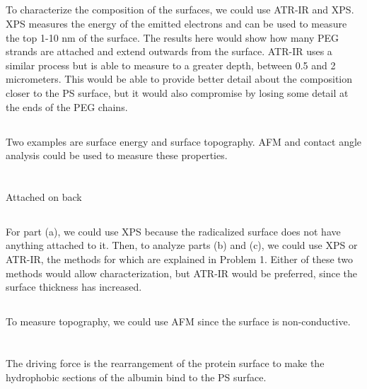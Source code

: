 \documentclass{article}
\begin{document}
\subsection{}
To characterize the composition of the surfaces, we could use ATR-IR and XPS. XPS measures the energy of the emitted electrons and can be used to measure the top 1-10 nm of the surface. The results here would show how many PEG strands are attached and extend outwards from the surface. ATR-IR uses a similar process but is able to measure to a greater depth, between 0.5 and 2 micrometers. This would be able to provide better detail about the composition closer to the PS surface, but it would also compromise by losing some detail at the ends of the PEG chains.

\subsection{}
Two examples are surface energy and surface topography. AFM and contact angle analysis could be used to measure these properties.

\section{}
\subsection{}
Attached on back

\subsection{}
For part (a), we could use XPS because the radicalized surface does not have anything attached to it. Then, to analyze parts (b) and (c), we could use XPS or ATR-IR, the methods for which are explained in  Problem 1. Either of these two methods would allow characterization, but ATR-IR would be preferred, since the surface thickness has increased.

\subsection{}
To measure topography, we could use AFM since the surface is non-conductive.

\section{}
\subsection{}
The driving force is the rearrangement of the protein surface to make the hydrophobic sections of the albumin bind to the PS surface.
\end{document}
